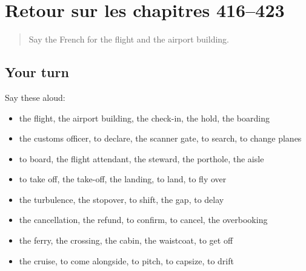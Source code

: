 \section[(dialogue)]{Retour sur les chapitres 416–423}

\label{lesson:FR-R423-revision-416-423}



\begin{quote}
Say the French for the flight and the airport building.
\end{quote}

\subsection*{Your turn}
Say these aloud:

\begin{itemize}
\raggedright
  \item the flight, the airport building, the check-in, the hold, the boarding
  \item the customs officer, to declare, the scanner gate, to search, to change planes
  \item to board, the flight attendant, the steward, the porthole, the aisle
  \item to take off, the take-off, the landing, to land, to fly over
  \item the turbulence, the stopover, to shift, the gap, to delay
  \item the cancellation, the refund, to confirm, to cancel, the overbooking
  \item the ferry, the crossing, the cabin, the waistcoat, to get off
  \item the cruise, to come alongside, to pitch, to capsize, to drift
\end{itemize}

